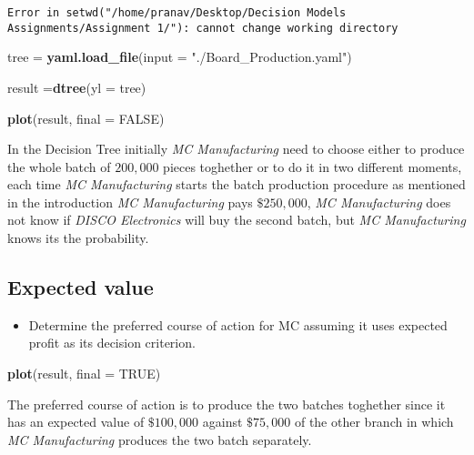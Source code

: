 \documentclass[]{article}
\newenvironment{Shaded}{\begin{snugshade}}{\end{snugshade}}
\newcommand{\KeywordTok}[1]{\textcolor[rgb]{0.13,0.29,0.53}{\textbf{#1}}}
\newcommand{\DataTypeTok}[1]{\textcolor[rgb]{0.13,0.29,0.53}{#1}}
\newcommand{\StringTok}[1]{\textcolor[rgb]{0.31,0.60,0.02}{#1}}
\newcommand{\OtherTok}[1]{\textcolor[rgb]{0.56,0.35,0.01}{#1}}
\newcommand{\NormalTok}[1]{#1}
\providecommand{\tightlist}{%
  \setlength{\itemsep}{0pt}\setlength{\parskip}{0pt}}
\begin{document}
\begin{verbatim}
Error in setwd("/home/pranav/Desktop/Decision Models Assignments/Assignment 1/"): cannot change working directory
\end{verbatim}

\begin{Shaded}
\begin{Highlighting}[]
\NormalTok{tree =}\StringTok{ }\KeywordTok{yaml.load_file}\NormalTok{(}\DataTypeTok{input =} \StringTok{"./Board_Production.yaml"}\NormalTok{)}

\NormalTok{result =}\KeywordTok{dtree}\NormalTok{(}\DataTypeTok{yl =}\NormalTok{ tree)}

\KeywordTok{plot}\NormalTok{(result, }\DataTypeTok{final =} \OtherTok{FALSE}\NormalTok{)}
\end{Highlighting}
\end{Shaded}

\hypertarget{htmlwidget-202b6d9078879e5c77ad}{}

In the Decision Tree initially \emph{MC Manufacturing} need to choose
either to produce the whole batch of \(200,000\) pieces toghether or to
do it in two different moments, each time \emph{MC Manufacturing} starts
the batch production procedure as mentioned in the introduction \emph{MC
Manufacturing} pays \(\$250,000\), \emph{MC Manufacturing} does not know
if \emph{DISCO Electronics} will buy the second batch, but \emph{MC
Manufacturing} knows its the probability.

\subsection{Expected value}\label{expected-value}

\begin{itemize}
\tightlist
\item
  Determine the preferred course of action for MC assuming it uses
  expected profit as its decision criterion.
\end{itemize}

\begin{Shaded}
\begin{Highlighting}[]
\KeywordTok{plot}\NormalTok{(result, }\DataTypeTok{final =} \OtherTok{TRUE}\NormalTok{)}
\end{Highlighting}
\end{Shaded}

\hypertarget{htmlwidget-231d0239b9eca5a0eae4}{}

The preferred course of action is to produce the two batches toghether
since it has an expected value of \(\$100,000\) against \(\$75,000\) of
the other branch in which \emph{MC Manufacturing} produces the two batch
separately.
\end{document}
